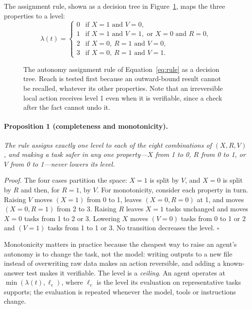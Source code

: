 The assignment rule, shown as a decision tree in Figure~\ref{fig:autonomy}, maps the three
properties to a level:
\begin{equation}
  \lambda(t) =
  \begin{cases}
    0 & \text{if } X=1 \text{ and } V=0,\\
    1 & \text{if } X=1 \text{ and } V=1, \text{ or } X=0 \text{ and } R=0,\\
    2 & \text{if } X=0,\ R=1 \text{ and } V=0,\\
    3 & \text{if } X=0,\ R=1 \text{ and } V=1.
  \end{cases}
  \label{eq:rule}
\end{equation}

\begin{figure}[htbp]
  \centering
  
  \caption{The autonomy assignment rule of Equation~\eqref{eq:rule} as a decision tree.
  Reach is tested first because an outward-bound result cannot be recalled, whatever
  its other properties. Note that an irreversible local action receives level 1 even when
  it is verifiable, since a check after the fact cannot undo it.}
  \label{fig:autonomy}
\end{figure}

\paragraph{Proposition 1 (completeness and monotonicity).} \textit{The rule assigns
exactly one level to each of the eight combinations of $(X,R,V)$, and making a task safer
in any one property---$X$ from 1 to 0, $R$ from 0 to 1, or $V$ from 0 to 1---never lowers
its level.}

\textit{Proof.} The four cases partition the space: $X=1$ is split by $V$, and $X=0$ is
split by $R$ and then, for $R=1$, by $V$. For monotonicity, consider each property in
turn. Raising $V$ moves $(X{=}1)$ from 0 to 1, leaves $(X{=}0,R{=}0)$ at 1, and moves
$(X{=}0,R{=}1)$ from 2 to 3. Raising $R$ leaves $X=1$ tasks unchanged and moves $X=0$
tasks from 1 to 2 or 3. Lowering $X$ moves $(V{=}0)$ tasks from 0 to 1 or 2 and $(V{=}1)$
tasks from 1 to 1 or 3. No transition decreases the level. $\square$

Monotonicity matters in practice because the cheapest way to raise an agent's autonomy is
to change the task, not the model: writing outputs to a new file instead of overwriting
raw data makes an action reversible, and adding a known-answer test makes it verifiable.
The level is a \emph{ceiling}. An agent operates at $\min(\lambda(t), \ell_e)$, where
$\ell_e$ is the level its evaluation on representative tasks supports; the evaluation is
repeated whenever the model, tools or instructions change.


